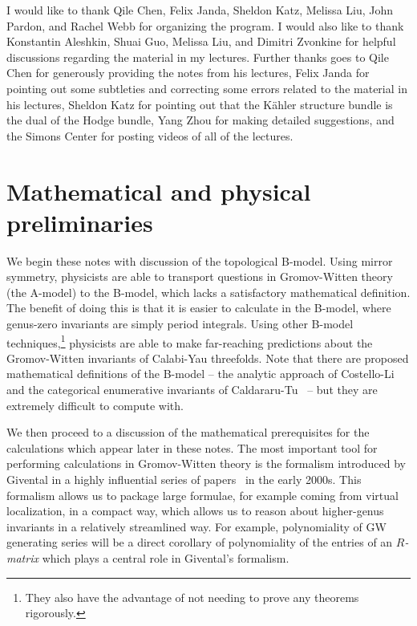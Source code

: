 \documentclass[10pt,oldfontcommands,oneside]{memoir}
\theoremstyle{definition}
\theoremstyle{remark}
\theoremstyle{plain}
\theoremstyle{definition}
\theoremstyle{remark}
\newcommand{\1}{\mathbf{1}}
\newcommand{\2}{\mathbf{2}}
\newcommand{\3}{\mathbf{3}}
\begin{document}
I would like to thank Qile Chen, Felix Janda, Sheldon Katz, Melissa Liu, John Pardon, and Rachel Webb for organizing the program. I would also like to thank Konstantin Aleshkin, Shuai Guo, Melissa Liu, and Dimitri Zvonkine for helpful discussions regarding the material in my lectures. Further thanks goes to Qile Chen for generously providing the notes from his lectures, Felix Janda for pointing out some subtleties and correcting some errors related to the material in his lectures, Sheldon Katz for pointing out that the K\"ahler structure bundle is the dual of the Hodge bundle, Yang Zhou for making detailed suggestions, and the Simons Center for posting videos of all of the lectures.


\clearpage
\tableofcontents
\clearpage


\mainmatter
\pagestyle{firstpage}

\chapter{Mathematical and physical preliminaries}\thispagestyle{firstpage}
\label{pt:prelim}

We begin these notes with discussion of the topological B-model. Using mirror symmetry, physicists are able to transport questions in Gromov-Witten theory (the A-model) to the B-model, which lacks a satisfactory mathematical definition. The benefit of doing this is that it is easier to calculate in the B-model, where genus-zero invariants are simply period integrals. Using other B-model techniques,\footnote{They also have the advantage of not needing to prove any theorems rigorously.} physicists are able to make far-reaching predictions about the Gromov-Witten invariants of Calabi-Yau threefolds. Note that there are proposed mathematical definitions of the B-model -- the analytic approach of Costello-Li~\cite{mathbcov1,mathbcov2} and the categorical enumerative invariants of Caldararu-Tu~\cite{cei} -- but they are extremely difficult to compute with.

We then proceed to a discussion of the mathematical prerequisites for the calculations which appear later in these notes. The most important tool for performing calculations in Gromov-Witten theory is the formalism introduced by Givental in a highly influential series of papers~\cite{ssfrobhg,virasorofanotoric,symplfrob} in the early 2000s. This formalism allows us to package large formulae, for example coming from virtual localization, in a compact way, which allows us to reason about higher-genus invariants in a relatively streamlined way. For example, polynomiality of GW generating series will be a direct corollary of polynomiality of the entries of an \textit{$R$-matrix} which plays a central role in Givental's formalism.
\end{document}
